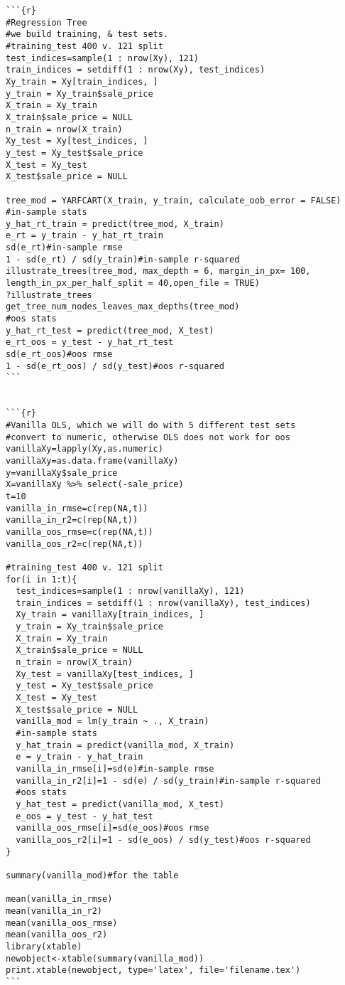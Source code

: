 \documentclass{article}
\begin{document}
\begin{lstlisting}
```{r}
#Regression Tree
#we build training, & test sets.
#training_test 400 v. 121 split
test_indices=sample(1 : nrow(Xy), 121)
train_indices = setdiff(1 : nrow(Xy), test_indices)
Xy_train = Xy[train_indices, ]
y_train = Xy_train$sale_price
X_train = Xy_train
X_train$sale_price = NULL
n_train = nrow(X_train)
Xy_test = Xy[test_indices, ]
y_test = Xy_test$sale_price
X_test = Xy_test
X_test$sale_price = NULL

tree_mod = YARFCART(X_train, y_train, calculate_oob_error = FALSE)
#in-sample stats
y_hat_rt_train = predict(tree_mod, X_train)
e_rt = y_train - y_hat_rt_train
sd(e_rt)#in-sample rmse
1 - sd(e_rt) / sd(y_train)#in-sample r-squared
illustrate_trees(tree_mod, max_depth = 6, margin_in_px= 100, length_in_px_per_half_split = 40,open_file = TRUE)
?illustrate_trees
get_tree_num_nodes_leaves_max_depths(tree_mod)
#oos stats
y_hat_rt_test = predict(tree_mod, X_test)
e_rt_oos = y_test - y_hat_rt_test
sd(e_rt_oos)#oos rmse
1 - sd(e_rt_oos) / sd(y_test)#oos r-squared
```


```{r}
#Vanilla OLS, which we will do with 5 different test sets
#convert to numeric, otherwise OLS does not work for oos
vanillaXy=lapply(Xy,as.numeric)
vanillaXy=as.data.frame(vanillaXy)
y=vanillaXy$sale_price
X=vanillaXy %>% select(-sale_price)
t=10
vanilla_in_rmse=c(rep(NA,t))
vanilla_in_r2=c(rep(NA,t))
vanilla_oos_rmse=c(rep(NA,t))
vanilla_oos_r2=c(rep(NA,t))

#training_test 400 v. 121 split
for(i in 1:t){
  test_indices=sample(1 : nrow(vanillaXy), 121)
  train_indices = setdiff(1 : nrow(vanillaXy), test_indices)
  Xy_train = vanillaXy[train_indices, ]
  y_train = Xy_train$sale_price
  X_train = Xy_train
  X_train$sale_price = NULL
  n_train = nrow(X_train)
  Xy_test = vanillaXy[test_indices, ]
  y_test = Xy_test$sale_price
  X_test = Xy_test
  X_test$sale_price = NULL
  vanilla_mod = lm(y_train ~ ., X_train)
  #in-sample stats
  y_hat_train = predict(vanilla_mod, X_train)
  e = y_train - y_hat_train
  vanilla_in_rmse[i]=sd(e)#in-sample rmse
  vanilla_in_r2[i]=1 - sd(e) / sd(y_train)#in-sample r-squared
  #oos stats
  y_hat_test = predict(vanilla_mod, X_test)
  e_oos = y_test - y_hat_test
  vanilla_oos_rmse[i]=sd(e_oos)#oos rmse
  vanilla_oos_r2[i]=1 - sd(e_oos) / sd(y_test)#oos r-squared
}

summary(vanilla_mod)#for the table

mean(vanilla_in_rmse)
mean(vanilla_in_r2)
mean(vanilla_oos_rmse)
mean(vanilla_oos_r2)
library(xtable)
newobject<-xtable(summary(vanilla_mod))
print.xtable(newobject, type='latex', file='filename.tex')
```


\end{lstlisting}
\end{document}
